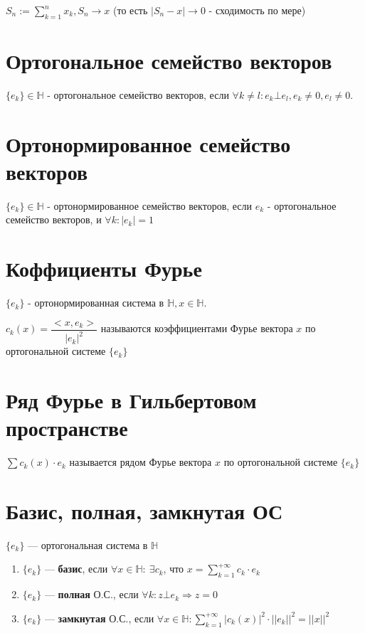 \documentclass[paper=a4, fontsize=17pt]{article}
\begin{document}
	$S_n := \sum\limits_{k = 1}^n x_k, S_n \rightarrow x$ (то есть $|S_n - x| \rightarrow 0$ - сходимость по мере) 
	
	\section{Ортогональное семейство векторов}
	$\{e_k\} \in \mathds{H}$ - ортогональное семейство векторов, если $\forall k \neq l: e_k \bot e_l, e_k \neq 0, e_l \neq 0$.
	
	\section{Ортонормированное семейство векторов}
	$\{e_k\} \in \mathds{H}$ - ортонормированное семейство векторов, если ${e_k}$ - ортогональное семейство векторов, и $\forall k: |e_k| = 1 $
	
	\section{Коффициенты Фурье}
	$\{e_k\}$ - ортонормированная система в $\mathds{H}, x \in \mathds{H}$.
	
	$c_k(x) = \dfrac{<x, e_k>}{|e_k|^2}$ называются коэффициентами Фурье вектора $x$ по ортогональной системе $\{e_k\}$
	
	\section{Ряд Фурье в Гильбертовом пространстве}
	
	$\sum c_k(x) \cdot e_k$ называется рядом Фурье вектора $x$ по ортогональной системе $\{e_k\}$
	
	\section{Базис, полная, замкнутая ОС}
	
	$\{e_k\}$ {{---}} ортогональная система в $\mathds{H}$
	
	\begin{enumerate}
		
		\item $\{e_k\}$ {{---}} \textbf{базис}, если $\forall x \in \mathds{H}:\ \exists c_k$, что $x = \sum\limits_{k=1}^{+\infty} c_k \cdot e_k$
		
		\item $\{e_k\}$ {{---}} \textbf{полная} О.С., если $\forall k: z \bot e_k \Rightarrow z = 0$
		
		\item $\{e_k\}$ {{---}} \textbf{замкнутая} О.С., если $\forall x \in \mathds{H}: \sum\limits_{k=1}^{+\infty} |c_k(x)|^2 \cdot ||e_k||^2 = ||x||^2$
		
	\end{enumerate}
	
\end{document}
